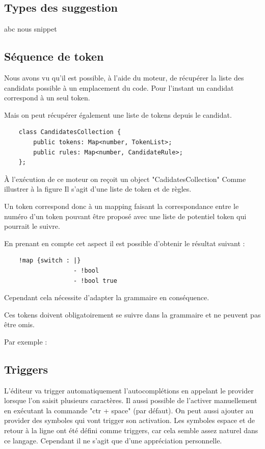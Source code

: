 \documentclass[
    iict, %
    il, %
]{heig-tb}
\begin{document}
\subsection{Types des suggestion}
abc
nous
snippet

\subsection{Séquence de token}


Nous avons vu qu'il est possible, à l'aide du moteur, de récupérer la liste des candidats possible à un emplacement du code.
Pour l'instant un candidat correspond à un seul token.

Mais on peut récupérer également une liste de tokens depuis le candidat.

\begin{lstlisting}
    class CandidatesCollection {
        public tokens: Map<number, TokenList>;
        public rules: Map<number, CandidateRule>;
    };
\end{lstlisting}


À l'exécution de ce moteur on reçoit un object "CadidatesCollection"
Comme illustrer à la figure %
Il s'agit d'une liste de token et de règles.

Un token correspond donc à un mapping faisant la correspondance entre le numéro d'un token pouvant être proposé avec une liste de potentiel token qui pourrait le suivre.

En prenant en compte cet aspect il est possible d'obtenir le résultat suivant :

\begin{lstlisting}
    !map {switch : |}
                   - !bool
                   - !bool true
\end{lstlisting}

Cependant cela nécessite d'adapter la grammaire en conséquence.

Ces tokens doivent obligatoirement se suivre dans la grammaire %
et ne peuvent pas être omis.

Par exemple : %

\subsection{Triggers}
L'éditeur va trigger automatiquement l'autocomplétions en appelant le provider lorsque l'on saisit plusieurs caractères. Il aussi possible de l'activer manuellement en exécutant la commande "ctr + space" (par défaut).
On peut aussi ajouter au provider des symboles qui vont trigger son activation. Les symboles espace et de retour à la ligne ont été défini comme triggers, car cela semble assez naturel dans ce langage. Cependant il ne s'agit que d'une appréciation personnelle.
\end{document}
